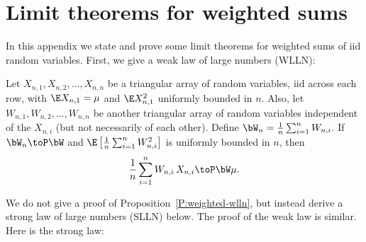 \chapter{Limit theorems for weighted sums}\label{A:weighted-sums}

In this appendix we state and prove some limit theorems for weighted sums
of iid random variables.  First, we give a weak law of large numbers (WLLN):

\begin{proposition}\label{P:weighted-wlln}
    Let $X_{n,1}, X_{n,2}, \ldots, X_{n,n}$ be a triangular array of random
    variables, iid across each row, with $\E X_{n,1} = \mu$ and $\E 
    X_{n,1}^2$  uniformly bounded in $n$.  Also, let $W_{n,1}, W_{n,2}, \ldots, 
    W_{n,n}$ be another triangular array of random variables independent of 
    the $X_{n,i}$ (but not necessarily of each other).  Define 
    \(
        \bW_n = \frac{1}{n} \sum_{i=1}^n W_{n,i}.
    \) 
    If $\bW_n \toP \bW$ and 
    $\E \left[ \frac{1}{n} \sum_{i=1}^n W_{n,i}^2 \right]$ is uniformly 
    bounded in $n$, then
    \begin{equation}
        \frac{1}{n} \sum_{i=1}^n W_{n,i} \, X_{n,i} \toP \bW \mu.
    \end{equation}
\end{proposition}

We do not give a proof of Proposition~\ref{P:weighted-wlln}, but instead derive a strong law of large numbers (SLLN) below.  The proof of the weak law is similar.  Here is the strong law:

